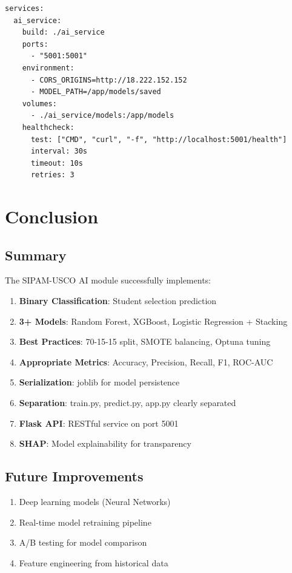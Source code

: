 \documentclass[12pt,a4paper]{report}
\begin{document}
\begin{lstlisting}[caption={docker-compose.yml excerpt}]
services:
  ai_service:
    build: ./ai_service
    ports:
      - "5001:5001"
    environment:
      - CORS_ORIGINS=http://18.222.152.152
      - MODEL_PATH=/app/models/saved
    volumes:
      - ./ai_service/models:/app/models
    healthcheck:
      test: ["CMD", "curl", "-f", "http://localhost:5001/health"]
      interval: 30s
      timeout: 10s
      retries: 3
\end{lstlisting}

\chapter{Conclusion}

\section{Summary}

The SIPAM-USCO AI module successfully implements:

\begin{enumerate}
    \item \textbf{Binary Classification}: Student selection prediction
    \item \textbf{3+ Models}: Random Forest, XGBoost, Logistic Regression + Stacking
    \item \textbf{Best Practices}: 70-15-15 split, SMOTE balancing, Optuna tuning
    \item \textbf{Appropriate Metrics}: Accuracy, Precision, Recall, F1, ROC-AUC
    \item \textbf{Serialization}: joblib for model persistence
    \item \textbf{Separation}: train.py, predict.py, app.py clearly separated
    \item \textbf{Flask API}: RESTful service on port 5001
    \item \textbf{SHAP}: Model explainability for transparency
\end{enumerate}

\section{Future Improvements}

\begin{enumerate}
    \item Deep learning models (Neural Networks)
    \item Real-time model retraining pipeline
    \item A/B testing for model comparison
    \item Feature engineering from historical data
\end{enumerate}
\end{document}

